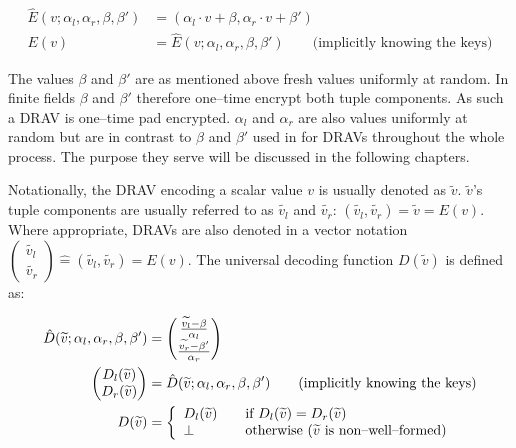 \begin{align}
  \label{eqn:one-time-pad}
  \hat{E}(v; \alpha_l, \alpha_r, \beta, \beta') &=
  (\alpha_l \cdot v + \beta, \alpha_r \cdot v + \beta')\\
  E(v) &= \hat{E}(v; \alpha_l, \alpha_r, \beta, \beta') \qquad
  \text{(implicitly knowing the keys)}\nonumber
\end{align}

\noindent{}The values $\beta$ and $\beta'$ are as mentioned above fresh values
uniformly at random. In finite fields $\beta$ and $\beta'$ therefore one--time
encrypt both tuple components. As such a DRAV is one--time pad encrypted.
$\alpha_l$ and $\alpha_r$ are also values uniformly at random but are in
contrast to $\beta$ and $\beta'$ used in for DRAVs throughout the whole
process. The purpose they serve will be discussed in the following chapters.

Notationally, the DRAV encoding a scalar value $v$ is usually denoted as
$\widetilde{v}$. $\widetilde{v}$'s tuple components are usually referred to as
$\widetilde{v_l}$ and $\widetilde{v_r}$: $(\widetilde{v_l}, \widetilde{v_r}) =
\widetilde{v} = E(v)$. Where appropriate, DRAVs are also denoted in a vector
notation $\begin{pmatrix}\widetilde{v_l}\\\widetilde{v_r}\end{pmatrix} \hat{=}
(\widetilde{v_l}, \widetilde{v_r}) = E(v)$. The universal decoding function
$D(\widetilde{v})$ is defined as:

\begin{align}
  \hat{D}(\widetilde{v}; \alpha_l, \alpha_r, \beta, \beta') &=
  \begin{pmatrix}
    \frac{\widetilde{v_l} - \beta}{\alpha_l}\\
    \frac{\widetilde{v_r} - \beta'}{\alpha_r}
  \end{pmatrix} \nonumber\\
  \label{eqn:keys-assumed}
\begin{pmatrix}D_l(\widetilde{v})\\D_r(\widetilde{v})\end{pmatrix} &=
  \hat{D}(\widetilde{v}; \alpha_l, \alpha_r, \beta, \beta') \qquad
  \text{(implicitly knowing the keys)}\\
  D(\widetilde{v}) &=
  \left\{
    \begin{array}{l l}
      D_l(\widetilde{v}) & \quad
      \text{if}~D_l(\widetilde{v}) = D_r(\widetilde{v})\\
      \bot & \quad \text{otherwise ($\widetilde{v}$ is non--well--formed)}\\
    \end{array}\right.\nonumber
\end{align}


